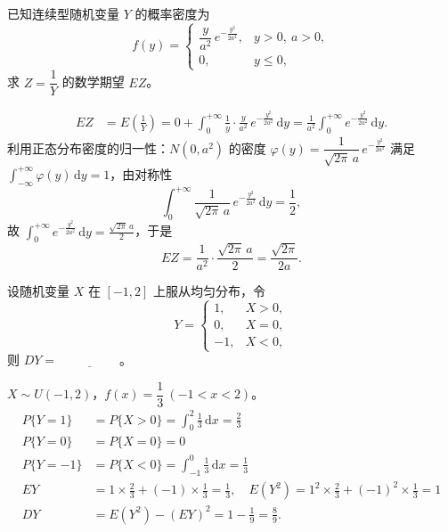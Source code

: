 \documentclass[lang=cn,11pt]{elegantbook}
\begin{document}
\begin{exercise}\label{exer:4-s7-rayleigh}
已知连续型随机变量 \(Y\) 的概率密度为
\[
f(y) = \begin{cases} \dfrac{y}{a^2}\,e^{-\frac{y^2}{2a^2}}, & y > 0,\ a > 0, \\[4pt] 0, & y \leqslant 0, \end{cases}
\]
求 \(Z = \dfrac{1}{Y}\) 的数学期望 \(EZ\)。
\end{exercise}

\begin{solution}
\[
\begin{aligned}
EZ &= E\!\left(\frac{1}{Y}\right) =0+ \int_0^{+\infty}\frac{1}{y}\cdot\frac{y}{a^2}\,e^{-\frac{y^2}{2a^2}}\,\mathrm{d}y = \frac{1}{a^2}\int_0^{+\infty}e^{-\frac{y^2}{2a^2}}\,\mathrm{d}y.
\end{aligned}
\]
利用正态分布密度的归一性：\(N(0,a^2)\) 的密度 \(\varphi(y) = \dfrac{1}{\sqrt{2\pi}\,a}\,e^{-\frac{y^2}{2a^2}}\) 满足 \(\displaystyle\int_{-\infty}^{+\infty}\varphi(y)\,\mathrm{d}y = 1\)，由对称性
\[
\int_0^{+\infty}\frac{1}{\sqrt{2\pi}\,a}\,e^{-\frac{y^2}{2a^2}}\,\mathrm{d}y = \frac{1}{2},
\]
故 \(\displaystyle\int_0^{+\infty}e^{-\frac{y^2}{2a^2}}\,\mathrm{d}y = \frac{\sqrt{2\pi}\,a}{2}\)，于是
\[
EZ = \frac{1}{a^2}\cdot\frac{\sqrt{2\pi}\,a}{2} = \frac{\sqrt{2\pi}}{2a}.
\]
\end{solution}


\begin{exercise}\label{exer:4-dy-seg}
设随机变量 \(X\) 在 \([-1,2]\) 上服从均匀分布，令
\[
Y = \begin{cases} 1, & X > 0, \\ 0, & X = 0, \\ -1, & X < 0, \end{cases}
\]
则 \(DY =\,\underline{\hspace{2cm}}\)。
\end{exercise}
\begin{solution}
\(X \sim U(-1,2)\)，\(f(x) = \dfrac{1}{3}\ (-1 < x < 2)\)。
\begin{align*}
P\{Y=1\} &= P\{X>0\} = \int_0^2 \frac{1}{3}\,\mathrm{d}x = \frac{2}{3}\\
P\{Y=0\} &= P\{X=0\} = 0\\
P\{Y=-1\} &= P\{X<0\} = \int_{-1}^0 \frac{1}{3}\,\mathrm{d}x = \frac{1}{3}\\
EY &= 1 \times \frac{2}{3} + (-1) \times \frac{1}{3} = \frac{1}{3},\quad E(Y^2) = 1^2 \times \frac{2}{3} + (-1)^2 \times \frac{1}{3} = 1\\
DY &= E(Y^2) - (EY)^2 = 1 - \frac{1}{9} = \frac{8}{9}.
\end{align*}
\end{solution}
\end{document}
